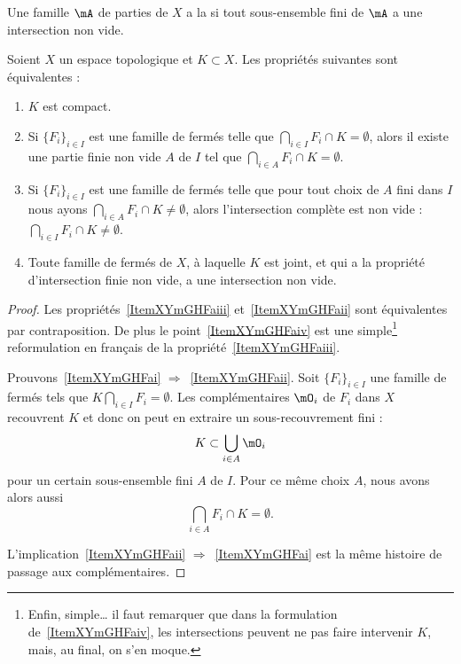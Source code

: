 \begin{definition}
	Une famille \( \mA\) de parties de \( X\) a la  si tout sous-ensemble fini de \( \mA\) a une intersection non vide.
\end{definition}

\begin{proposition}\label{PropXKUMiCj}
	Soient \( X\) un espace topologique et \( K\subset X\). Les propriétés suivantes sont équivalentes :
	\begin{enumerate}
		\item\label{ItemXYmGHFai}
		      \( K\) est compact.
		\item\label{ItemXYmGHFaii}
		      Si \( \{ F_i \}_{i\in I}\) est une famille de fermés telle que \( \bigcap_{i\in I}F_i \cap K =\emptyset\), alors il existe une partie finie non vide \( A\) de \( I\) tel que \( \bigcap_{i\in A}F_i \cap K =\emptyset\).
		\item\label{ItemXYmGHFaiii}
		      Si \( \{ F_i \}_{i\in I}\) est une famille de fermés telle que pour tout choix de \( A\) fini dans \( I\) nous ayons \( \bigcap_{i\in A}F_i \cap K \neq\emptyset\), alors l'intersection complète est non vide : \( \bigcap_{i\in I}F_i \cap K\neq\emptyset\).
		\item\label{ItemXYmGHFaiv}
		      Toute famille de fermés de \( X \), à laquelle \( K \) est joint, et qui a la propriété d'intersection finie non vide, a une intersection non vide.
	\end{enumerate}
\end{proposition}

\begin{proof}
	Les propriétés~\ref{ItemXYmGHFaiii} et~\ref{ItemXYmGHFaii} sont équivalentes par contraposition. De plus le point~\ref{ItemXYmGHFaiv} est une simple\footnote{Enfin, simple\dots{} il faut remarquer que dans la formulation de~\ref{ItemXYmGHFaiv}, les intersections peuvent ne pas faire intervenir \( K \), mais, au final, on s'en moque.} reformulation en français de la propriété~\ref{ItemXYmGHFaiii}.

	Prouvons~\ref{ItemXYmGHFai} \( \Rightarrow\)~\ref{ItemXYmGHFaii}. Soit \( \{ F_i \}_{i\in I}\) une famille de fermés tels que \( K\bigcap_{i\in I}F_i=\emptyset\). Les complémentaires \( \mO_i\) de \( F_i\) dans \( X\) recouvrent \( K\) et donc on peut en extraire un sous-recouvrement fini :
	\begin{equation}
		K\subset\bigcup_{i\in A}\mO_i
	\end{equation}
	pour un certain sous-ensemble fini \( A\) de \( I\). Pour ce même choix \( A\), nous avons alors aussi
	\begin{equation}
		\bigcap_{i\in A}F_i \cap K =\emptyset.
	\end{equation}

	L'implication~\ref{ItemXYmGHFaii} \( \Rightarrow\)~\ref{ItemXYmGHFai} est la même histoire de passage aux complémentaires.
\end{proof}

